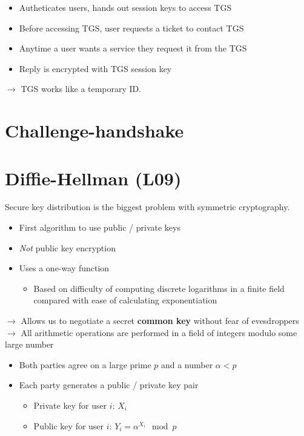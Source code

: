 \documentclass{easyclass}
\begin{document}
\begin{lem}{}
    \begin{itemize}
        \item Autheticates users, hands out session keys to access TGS
        \item Before accessing TGS, user requests a ticket to contact TGS
    \end{itemize}
\end{lem}

\begin{lem}{}
    \begin{itemize}
        \item Anytime a user wants a service they request it from the TGS
        \item Reply is encrypted with TGS session key
    \end{itemize}
    $\rightarrow$ TGS works like a temporary ID.
\end{lem}
\chapter{Challenge-handshake}

\chapter{Diffie-Hellman (L09)}
Secure key distribution is the biggest problem with symmetric cryptography.

\begin{theo}{}
    \begin{itemize}
        \item First algorithm to use public / private keys
        \item \emph{Not} public key encryption
        \item Uses a one-way function 
        \begin{itemize}
            \item Based on difficulty of computing discrete 
            logarithms in a finite field compared with ease of calculating exponentiation
        \end{itemize}
    \end{itemize}
    $\rightarrow$ Allows us to negotiate a secret \textbf{common key} without fear of evesdroppers\\
    $\rightarrow$ All arithmetic operations are performed in a field of integers modulo some large number
    \begin{itemize}
        \item Both parties agree on a large prime $p$ and a number $\alpha < p$
        \item Each party generates a public / private key pair
        \begin{itemize}
            \item Private key for user $i$: $X_i$
            \item Public key for user $i$: $Y_i = \alpha^{X_i} \mod p$
        \end{itemize}
    \end{itemize}
\end{theo}
\end{document}
